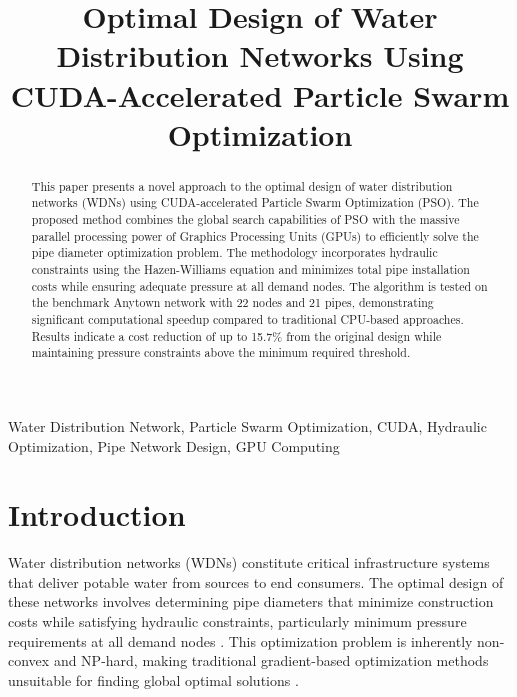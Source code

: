 \documentclass[conference]{IEEEtran}
\begin{document}
\title{Optimal Design of Water Distribution Networks Using CUDA-Accelerated Particle Swarm Optimization}

\author{
\and
{}
}

\maketitle

\begin{abstract}
This paper presents a novel approach to the optimal design of water distribution networks (WDNs) using CUDA-accelerated Particle Swarm Optimization (PSO). The proposed method combines the global search capabilities of PSO with the massive parallel processing power of Graphics Processing Units (GPUs) to efficiently solve the pipe diameter optimization problem. The methodology incorporates hydraulic constraints using the Hazen-Williams equation and minimizes total pipe installation costs while ensuring adequate pressure at all demand nodes. The algorithm is tested on the benchmark Anytown network with 22 nodes and 21 pipes, demonstrating significant computational speedup compared to traditional CPU-based approaches. Results indicate a cost reduction of up to 15.7\% from the original design while maintaining pressure constraints above the minimum required threshold.
\end{abstract}
\begin{keywords}
Water Distribution Network, Particle Swarm Optimization, CUDA, Hydraulic Optimization, Pipe Network Design, GPU Computing
\end{keywords}

\section{Introduction}

Water distribution networks (WDNs) constitute critical infrastructure systems that deliver potable water from sources to end consumers. The optimal design of these networks involves determining pipe diameters that minimize construction costs while satisfying hydraulic constraints, particularly minimum pressure requirements at all demand nodes \cite{mays2000water}. This optimization problem is inherently non-convex and NP-hard, making traditional gradient-based optimization methods unsuitable for finding global optimal solutions \cite{simpson1994optimal}.
\end{document}
